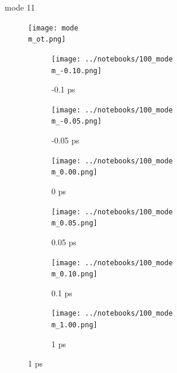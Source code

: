 \documentclass{beamer}
\begin{document}
\renewcommand\m{11}
\begin{frame}{mode \m}
		\vspace{\vh mm}
	\begin{figure}
		\centering
		\texttt{[image: mode\\m\_ot.png]}
	\end{figure}
	\begin{figure}
		\centering
		\begin{subfigure}[b]{\w\textwidth}
			\centering
			\texttt{[image: ../notebooks/100\_mode\\m\_-0.10.png]}
			\caption{-0.1 ps}
		\end{subfigure}
		\begin{subfigure}[b]{\w\textwidth}
			\centering
			\texttt{[image: ../notebooks/100\_mode\\m\_-0.05.png]}
			\caption{-0.05 ps}
		\end{subfigure}
		\begin{subfigure}[b]{\w\textwidth}
			\centering
			\texttt{[image: ../notebooks/100\_mode\\m\_0.00.png]}
			\caption{0 ps}
		\end{subfigure}
		\begin{subfigure}[b]{\w\textwidth}
			\centering
			\texttt{[image: ../notebooks/100\_mode\\m\_0.05.png]}
			\caption{0.05 ps}
		\end{subfigure}
		\begin{subfigure}[b]{\w\textwidth}
			\centering
			\texttt{[image: ../notebooks/100\_mode\\m\_0.10.png]}
			\caption{0.1 ps}
		\end{subfigure}
		\begin{subfigure}[b]{\w\textwidth}
			\centering
			\texttt{[image: ../notebooks/100\_mode\\m\_1.00.png]}
			\caption{1 ps}
		\end{subfigure}
	\end{figure}
\end{frame}
\end{document}

